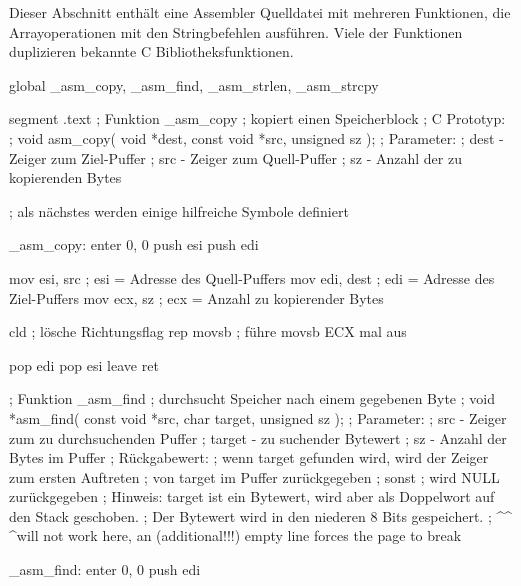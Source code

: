 Dieser Abschnitt enth\"{a}lt eine Assembler Quelldatei mit mehreren
Funktionen, die Arrayoperationen mit den Stringbefehlen ausf\"{u}hren.
Viele der Funktionen duplizieren bekannte C Bibliotheksfunktionen.
\pagebreak
{}
\begin{AsmCodeListing}[label=memory.asm, numbers=left, commandchars=\\\{\}]
 global _asm_copy, _asm_find, _asm_strlen, _asm_strcpy

 segment .text
 ; Funktion _asm_copy
 ; kopiert einen Speicherblock
 ; C Prototyp:
 ; void asm_copy( void *dest, const void *src, unsigned sz );
 ; Parameter:
 ;   dest - Zeiger zum Ziel-Puffer
 ;   src  - Zeiger zum Quell-Puffer
 ;   sz   - Anzahl der zu kopierenden Bytes

 ; als n\"{a}chstes werden einige hilfreiche Symbole definiert

 _asm_copy:
         enter   0, 0
         push    esi
         push    edi

         mov     esi, src        ; esi = Adresse des Quell-Puffers
         mov     edi, dest       ; edi = Adresse des Ziel-Puffers
         mov     ecx, sz         ; ecx = Anzahl zu kopierender Bytes

         cld                     ; l\"{o}sche Richtungsflag
         rep     movsb           ; f\"{u}hre movsb ECX mal aus

         pop     edi
         pop     esi
         leave
         ret


 ; Funktion _asm_find
 ; durchsucht Speicher nach einem gegebenen Byte
 ; void *asm_find( const void *src, char target, unsigned sz );
 ; Parameter:
 ;   src    - Zeiger zum zu durchsuchenden Puffer
 ;   target - zu suchender Bytewert
 ;   sz     - Anzahl der Bytes im Puffer
 ; R\"{u}ckgabewert:
 ;   wenn target gefunden wird, wird der Zeiger zum ersten Auftreten
 ;     von target im Puffer zur\"{u}ckgegeben
 ;   sonst
 ;     wird NULL zur\"{u}ckgegeben
 ; Hinweis: target ist ein Bytewert, wird aber als Doppelwort auf den Stack geschoben.
 ;          Der Bytewert wird in den niederen 8 Bits gespeichert.
 ;
 ^\pagebreak[4]  ^%
 ^\pagebreak will not work here, an (additional!!!) empty line  forces the page to break



 _asm_find:
         enter   0, 0
         push    edi


\end{AsmCodeListing}

